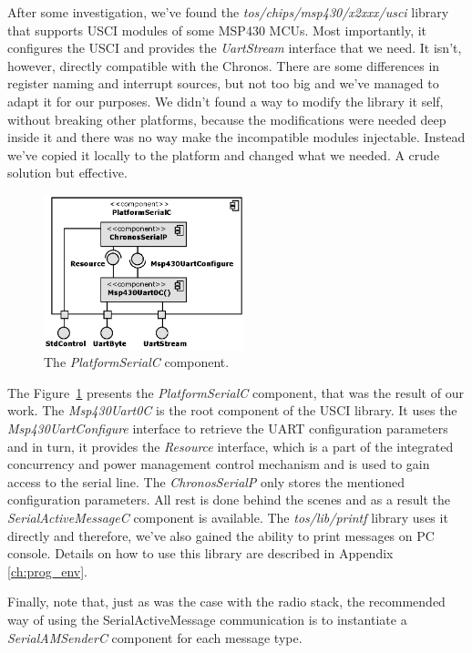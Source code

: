 After some investigation, we've found the \emph{tos/chips/msp430/x2xxx/usci} library that supports USCI modules of some MSP430 MCUs. Most importantly, it configures the USCI and provides the \emph{UartStream} interface that we need. It isn't, however, directly compatible with the Chronos. There are some differences in register naming and interrupt sources, but not too big and we've managed to adapt it for our purposes. We didn't found a way to modify the library it self, without breaking other platforms, because the modifications were needed deep inside it and there was no way make the incompatible modules injectable. Instead we've copied it locally to the platform and changed what we needed. A crude solution but effective.

\begin{figure}[h]
  \centering
  \includegraphics[width=0.52\textwidth]{diagrams/platform_serial_c.eps}
  \caption{The \emph{PlatformSerialC} component.}
  \label{fig:platform_serial_c}
\end{figure}

The Figure~\ref{fig:platform_serial_c} presents the \emph{PlatformSerialC} component, that was the result of our work. The \emph{Msp430Uart0C} is the root component of the USCI library. It uses the \emph{Msp430UartConfigure} interface to retrieve the UART configuration parameters and in turn, it provides the \emph{Resource} interface, which is a part of the integrated concurrency and power management control mechanism and is used to gain access to the serial line. The \emph{ChronosSerialP} only stores the mentioned configuration parameters. All rest is done behind the scenes and as a result the \emph{SerialActiveMessageC} component is available. The \emph{tos/lib/printf} library uses it directly and therefore, we've also gained the ability to print messages on PC console. Details on how to use this library are described in Appendix \ref{ch:prog_env}.

Finally, note that, just as was the case with the radio stack, the recommended way of using the SerialActiveMessage communication is to instantiate a \emph{SerialAMSenderC} component for each message type.


